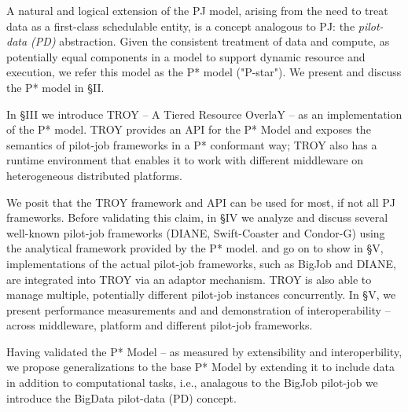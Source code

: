 \documentclass[conference,final]{IEEEtran}
\newcommand{\jhanote}[1]{ {\textcolor{red} { ***shantenu: #1 }}}
\newcommand{\alnote}[1]{ {\textcolor{blue} { ***andre: #1 }}}
\newcommand{\alnote}[1]{}
\newcommand{\jhanote}[1]{}
\begin{document}
A natural and logical extension of the PJ model, arising from the need
to treat data as a first-class schedulable entity, is a concept
analogous to PJ: the \emph{pilot-data (PD)} abstraction. Given the
consistent treatment of data and compute, as potentially equal
components in a model to support dynamic resource and execution,
we refer this model as the P* model ("P-star"). We present and discuss
the P* model in \S{II}.

In \S{III} we introduce TROY -- A Tiered Resource OverlaY -- as an
implementation of the P* model. TROY provides an API for the P* Model
and exposes the semantics of pilot-job frameworks in a P* conformant
way; TROY also has a runtime environment that enables it to work with
different middleware on heterogeneous distributed platforms.  

We posit that the TROY framework and API can be used for most, if not
all PJ frameworks.  Before validating this claim, in \S{IV} we analyze
and discuss several well-known pilot-job frameworks (DIANE,
Swift-Coaster and Condor-G) using the analytical framework provided by
the P* model.  and go on to show in \S{V}, implementations of the
actual pilot-job frameworks, such as BigJob and DIANE, are integrated
into TROY via an adaptor mechanism. TROY is also able to manage
multiple, potentially different pilot-job instances concurrently. In
\S{V}, we present performance measurements and and demonstration of
interoperability -- across middleware, platform and different
pilot-job frameworks.


Having validated the P* Model -- as measured by extensibility and
interoperbility, we propose generalizations to the base P* Model by
extending it to include data in addition to computational tasks, i.e.,
analagous to the BigJob pilot-job we introduce the BigData pilot-data
(PD) concept.



\end{document}
